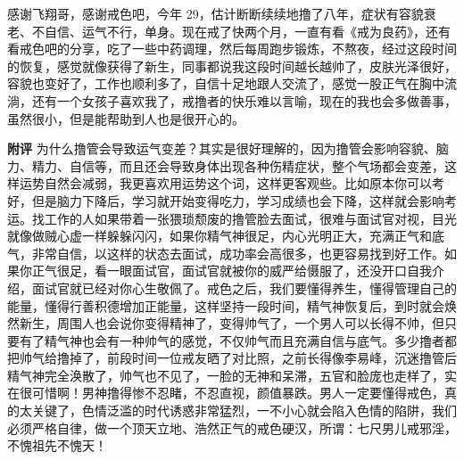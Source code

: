 \begin{case}
    感谢飞翔哥，感谢戒色吧，今年 29，估计断断续续地撸了八年，症状有容貌衰老、不自信、运气不行，单身。现在戒了快两个月，一直有看《戒为良药》，还有看戒色吧的分享，吃了一些中药调理，然后每周跑步锻炼，不熬夜，经过这段时间的恢复，感觉就像获得了新生，同事都说我这段时间越长越帅了，皮肤光泽很好，容貌也变好了，工作也顺利多了，自信十足地跟人交流了，感觉一股正气在胸中流淌，还有一个女孩子喜欢我了，戒撸者的快乐难以言喻，现在的我也会多做善事，虽然很小，但是能帮助到人也是很开心的。

    \textbf{附评} 为什么撸管会导致运气变差？其实是很好理解的，因为撸管会影响容貌、脑力、精力、自信等，而且还会导致身体出现各种伤精症状，整个气场都会变差，这样运势自然会减弱，我更喜欢用运势这个词，这样更客观些。比如原本你可以考好，但是脑力下降后，学习就开始变得吃力，学习成绩也会下降，这样就会影响考运。找工作的人如果带着一张猥琐颓废的撸管脸去面试，很难与面试官对视，目光就像做贼心虚一样躲躲闪闪，如果你精气神很足，内心光明正大，充满正气和底气，非常自信，以这样的状态去面试，成功率会高很多，也更容易找到好工作。如果你正气很足，看一眼面试官，面试官就被你的威严给慑服了，还没开口自我介绍，面试官就已经对你心生敬佩了。戒色之后，我们要懂得养生，懂得管理自己的能量，懂得行善积德增加正能量，这样坚持一段时间，精气神恢复后，到时就会焕然新生，周围人也会说你变得精神了，变得帅气了，一个男人可以长得不帅，但只要有了精气神也会有一种帅气的感觉，不仅帅气而且充满自信与底气。多少撸者都把帅气给撸掉了，前段时间一位戒友晒了对比照，之前长得像李易峰，沉迷撸管后精气神完全涣散了，帅气也不见了，一脸的无神和呆滞，五官和脸庞也走样了，实在很可惜啊！男神撸得惨不忍睹，不忍直视，颜值暴跌。男人一定要懂得戒色，真的太关键了，色情泛滥的时代诱惑非常猛烈，一不小心就会陷入色情的陷阱，我们必须严格自律，做一个顶天立地、浩然正气的戒色硬汉，所谓：七尺男儿戒邪淫，不愧祖先不愧天！
\end{case}

